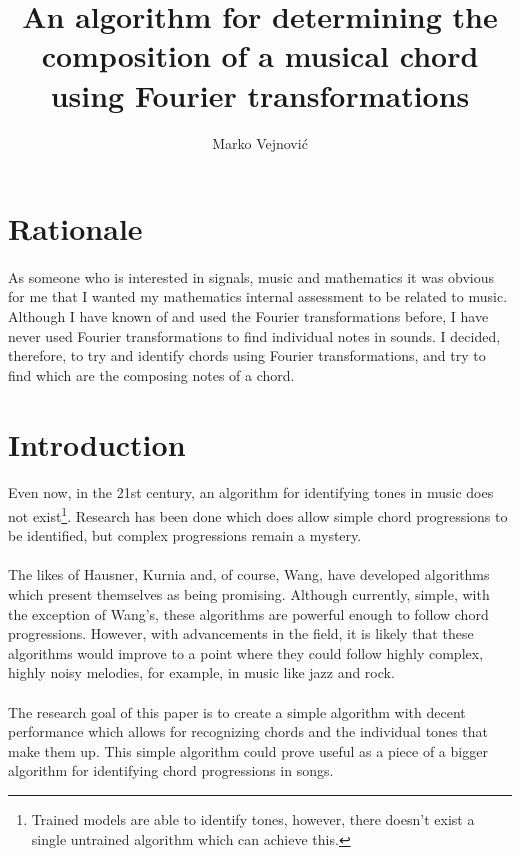 \documentclass{article}
\title{An algorithm for determining the composition of a musical chord using 
	Fourier transformations}
\author{Marko Vejnovi\'{c}}
\begin{document}
\maketitle

\section{Rationale}
\paragraph*{}
As someone who is interested in signals, music and mathematics it was obvious 
for me that I wanted my mathematics internal assessment to be related to 
music. Although I have known of and used the Fourier transformations before, I 
have never used Fourier transformations to find individual notes in sounds. I 
decided, therefore, to try and identify chords using Fourier transformations, 
and try to find which are the composing notes of a chord.

\section{Introduction}

\paragraph*{}
Even now, in the 21st century, an algorithm for identifying tones in music 
does not exist\footnote{Trained models are able to identify tones, however, 
there doesn't exist a single untrained algorithm which can achieve this.}. 
Research has been done which does allow simple chord progressions to be 
identified, but complex progressions remain a mystery.

\paragraph*{}
The likes of Hausner, Kurnia and, of course, Wang, have developed algorithms 
which present themselves as being promising. Although currently, simple, with 
the exception of Wang's, these algorithms are powerful enough to follow chord 
progressions. However, with advancements in the field, it is likely that these 
algorithms would improve to a point where they could follow highly complex, 
highly noisy melodies, for example, in music like jazz and rock.

\paragraph*{}
The research goal of this paper is to create a simple algorithm with decent 
performance which allows for recognizing chords and the individual tones that 
make them up. This simple algorithm could prove useful as a piece of a bigger 
algorithm for identifying chord progressions in songs.
\end{document}
